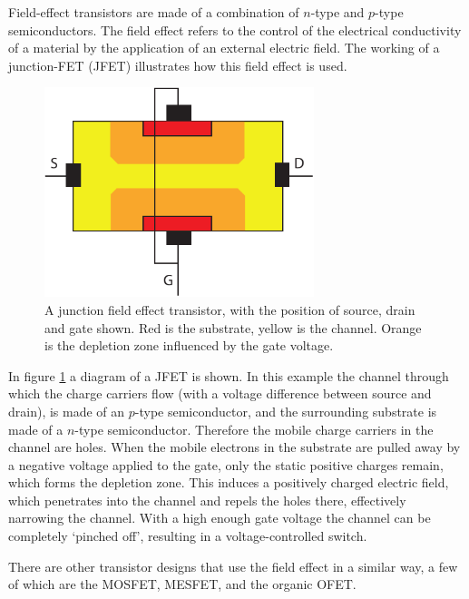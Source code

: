 Field-effect transistors are made of a combination of $n$-type and $p$-type semiconductors. The field effect refers to the control of the electrical conductivity of a material by the application of an external electric field. The working of a junction-FET (JFET) illustrates how this field effect is used.

\begin{figure}[!ht]
 \begin{center}
  \includegraphics[width=0.7\textwidth]{jfet}
  \caption{A junction field effect transistor, with the position of source, drain and gate shown. Red is the substrate, yellow is the channel. Orange is the depletion zone influenced by the gate voltage.}
  \label{fig:JFET}
 \end{center}
\end{figure}

In figure \ref{fig:JFET} a diagram of a JFET is shown. In this example the channel through which the charge carriers flow (with a voltage difference between source and drain), is made of an $p$-type semiconductor, and the surrounding substrate is made of a $n$-type semiconductor. Therefore the mobile charge carriers in the channel are holes. When the mobile electrons in the substrate are pulled away by a negative voltage applied to the gate, only the static positive charges remain, which forms the depletion zone. This induces a positively charged electric field, which penetrates into the channel and repels the holes there, effectively narrowing the channel. With a high enough gate voltage the channel can be completely `pinched off', resulting in a voltage-controlled switch.

There are other transistor designs that use the field effect in a similar way, a few of which are the MOSFET, MESFET, and the organic OFET. %

